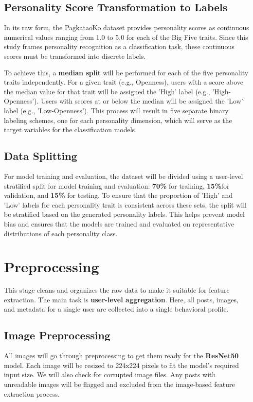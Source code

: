 \subsection{Personality Score Transformation to Labels}
In its raw form, the PagkataoKo dataset provides personality scores as continuous numerical values ranging from 1.0 to 5.0 for each of the Big Five traits. Since this study frames personality recognition as a classification task, these continuous scores must be transformed into discrete labels.

To achieve this, a \textbf{median split} will be performed for each of the five personality traits independently. For a given trait (e.g., Openness), users with a score above the median value for that trait will be assigned the 'High' label (e.g., 'High-Openness'). Users with scores at or below the median will be assigned the 'Low' label (e.g., 'Low-Openness'). This process will result in five separate binary labeling schemes, one for each personality dimension, which will serve as the target variables for the classification models.

\subsection{Data Splitting}
For model training and evaluation, the dataset will be divided using a user-level stratified split for model training and evaluation: \textbf{70\%} for training, \textbf{15\%}for validation, and \textbf{15\%} for testing. To ensure that the proportion of 'High' and 'Low' labels for each personality trait is consistent across these sets, the split will be stratified based on the generated personality labels. This helps prevent model bias and ensures that the models are trained and evaluated on representative distributions of each personality class.

\section{Preprocessing}
This stage cleans and organizes the raw data to make it suitable for feature extraction. The main task is \textbf{user-level aggregation}. Here, all posts, images, and metadata for a single user are collected into a single behavioral profile. 

\subsection{Image Preprocessing}
All images will go through preprocessing to get them ready for the \textbf{ResNet50} model. Each image will be resized to 224x224 pixels to fit the model’s required input size. We will also check for corrupted image files. Any posts with unreadable images will be flagged and excluded from the image-based feature extraction process.

